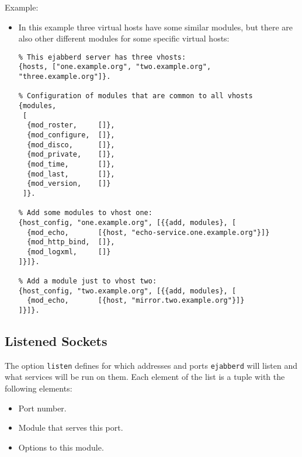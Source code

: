 \documentclass[a4paper,10pt]{book}
\newcommand{\ind}[1]{\begin{latexonly}\index{#1}\end{latexonly}}
\newcommand{\option}[1]{\texttt{#1}}
\newcommand{\ejabberd}{\texttt{ejabberd}}
\begin{document}
Example:
\begin{itemize}
	\item In this example three virtual hosts have some similar modules, but there are also
	other different modules for some specific virtual hosts:
\begin{verbatim}
% This ejabberd server has three vhosts:
{hosts, ["one.example.org", "two.example.org", "three.example.org"]}.

% Configuration of modules that are common to all vhosts
{modules,
 [
  {mod_roster,     []},
  {mod_configure,  []},
  {mod_disco,      []},
  {mod_private,    []},
  {mod_time,       []},
  {mod_last,       []},
  {mod_version,    []}
 ]}.

% Add some modules to vhost one:
{host_config, "one.example.org", [{{add, modules}, [
  {mod_echo,       [{host, "echo-service.one.example.org"}]}
  {mod_http_bind,  []},
  {mod_logxml,     []}
]}]}.

% Add a module just to vhost two:
{host_config, "two.example.org", [{{add, modules}, [
  {mod_echo,       [{host, "mirror.two.example.org"}]}
]}]}.
\end{verbatim}
\end{itemize}

\subsection{Listened Sockets}
\label{listened}
\ind{options!listen}

The option \option{listen} defines for which addresses and ports \ejabberd{}
will listen and what services will be run on them. Each element of the list is a
tuple with the following elements:
\begin{itemize}
\item Port number.
\item Module that serves this port.
\item Options to this module.
\end{itemize}
\end{document}

